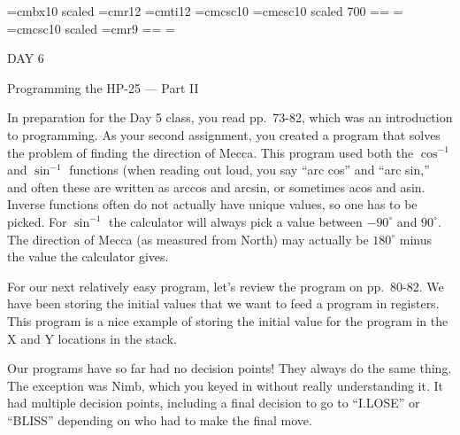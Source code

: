 
\def\folio{\ifnum\pageno>0 \number\pageno \else
   \ifnum\pageno<0 \romannumeral-\pageno \else\fi\fi}

\font\largebf=cmbx10  scaled 
\font\largerm=cmr12
\font\largeit=cmti12
\font\tensc=cmcsc10
\font\sevensc=cmcsc10 scaled 700
\newfam\scfam \def\sc{\fam\scfam\tensc}
\textfont\scfam=\tensc \scriptfont\scfam=\sevensc
\scriptscriptfont\scfam=\sevensc
\font\largesc=cmcsc10 scaled 
\font\ninerm=cmr9
\newfam\srfam \def\sr{\fam\srfam\ninerm}
\textfont\srfam=\ninerm \scriptfont\srfam=\sevenrm
\scriptscriptfont\srfam=\fiverm




\null\vskip36pt

\centerline{\largerm DAY 6}
\nobreak\bigskip

\centerline{\largeit Programming the HP-25 --- Part II}
\nobreak\bigskip


\nobreak\bigskip

In preparation for the Day 5 class, you read pp.~73-82, which was an introduction to programming. As your second assignment, you created a program that solves the problem of finding the direction of Mecca. This program used both the $\cos^{-1}$ and $\sin^{-1}$ functions (when reading out loud, you say ``arc cos'' and ``arc sin,'' and often these are written as arccos and arcsin, or sometimes acos and asin. Inverse functions often do not actually have unique values, so one has to be picked. For $\sin^{-1}$ the calculator will always pick a value between $-90^{\circ}$ and $90^{\circ}$. The direction of Mecca (as measured from North) may actually be $180^{\circ}$ minus the value the calculator gives.

For our next relatively easy program, let's review the program on pp.~80-82. We have been storing the initial values that we want to feed a program in registers. This program is a nice example of storing the initial value for the program in the X and Y locations in the stack.

\bigskip

\nobreak\bigskip

\noindent Our programs have so far had no decision points! They always do the same thing. The exception was Nimb, which you keyed in without really understanding it. It had multiple decision points, including a final decision to go to ``I.LOSE'' or ``BLISS'' depending on who had to make the final move.

